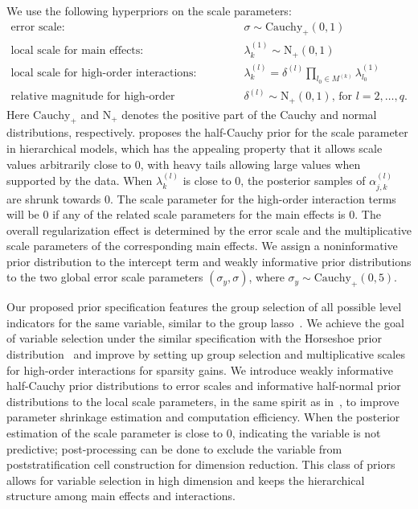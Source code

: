 \documentclass[11pt]{article}
\numberwithin{figure}{section}
\numberwithin{table}{section}
\numberwithin{equation}{section}
\begin{document}
We use the following hyperpriors on the scale parameters: \begin{align}
  \label{main} \nonumber  \mbox{error scale: }&\sigma \sim
  \textrm{Cauchy}_{+}(0,1) \\ \nonumber \mbox{local scale for main effects: } &
  \lambda_k^{(1)} \sim  \textrm{N}_{+}(0,1)\\ \nonumber	 \mbox{local scale for
  high-order interactions: } & \lambda^{(l)}_k=\delta^{(l)}\prod_{l_0\in
  M^{(k)}}\lambda^{(1)}_{l_0} \\ \mbox{relative magnitude for high-order
  interactions: }&\delta^{(l)}  \sim   \textrm{N}_{+}(0,1) \mbox{, for }
  l=2,\dots, q.  \end{align} Here $\textrm{Cauchy}_{+}$ and $\textrm{N}_{+}$
  denotes the positive part of the Cauchy and normal distributions,
  respectively.  \cite{gelman06-prior} proposes the half-Cauchy prior for the
  scale parameter in hierarchical models, which has the appealing property that
  it allows scale values arbitrarily close to 0, with heavy tails allowing
  large values when supported by the data. When $\lambda_k^{(l)}$ is close to
  0, the posterior samples of $\alpha_{j,k}^{(l)}$ are shrunk towards 0. The
  scale parameter for the high-order interaction terms will be 0 if any of the
  related scale parameters for the main effects is 0. The overall
  regularization effect is determined by the error scale and the multiplicative
  scale parameters of the corresponding main effects. We assign a
  noninformative prior distribution to the intercept term and weakly
  informative prior distributions to the two global error scale parameters
  $(\sigma_y, \sigma)$, where $\sigma_y\sim \textrm{Cauchy}_{+}(0,5)$.

Our proposed prior specification features the group selection of all possible
level indicators for the same variable, similar to the group
lasso~\citep{grouplasso06}. We achieve the goal of variable selection under the
similar specification with the Horseshoe prior distribution~\citep{horseshoe10}
and improve by setting up group selection and multiplicative scales for
high-order interactions for sparsity gains. We introduce weakly informative
half-Cauchy prior distributions to error scales and informative half-normal
prior distributions to the local scale parameters, in the same spirit as
in~\cite{hyperprior:Aki16}, to improve parameter shrinkage estimation and
computation efficiency. When the posterior estimation of the scale parameter is
close to 0, indicating the variable is not predictive; post-processing can be
done to exclude the variable from poststratification cell construction for
dimension reduction. This class of priors allows for variable selection in high
dimension and keeps the hierarchical structure among main effects and
interactions.
 
\end{document}
